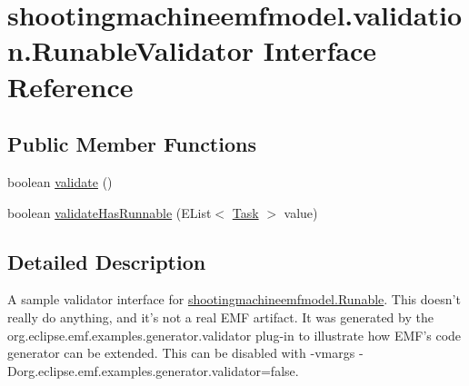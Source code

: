 \hypertarget{interfaceshootingmachineemfmodel_1_1validation_1_1_runable_validator}{\section{shootingmachineemfmodel.\-validation.\-Runable\-Validator Interface Reference}
\label{interfaceshootingmachineemfmodel_1_1validation_1_1_runable_validator}
}
\subsection*{Public Member Functions}
\begin{DoxyCompactItemize}
\item 
boolean \hyperlink{interfaceshootingmachineemfmodel_1_1validation_1_1_runable_validator_ac7ad034eb588dce3592d0c477161ca64}{validate} ()
\item 
boolean \hyperlink{interfaceshootingmachineemfmodel_1_1validation_1_1_runable_validator_ae59fc25d3e633b226c1d023cae7a4ae3}{validate\-Has\-Runnable} (E\-List$<$ \hyperlink{interfaceshootingmachineemfmodel_1_1_task}{Task} $>$ value)
\end{DoxyCompactItemize}


\subsection{Detailed Description}
A sample validator interface for \hyperlink{}{shootingmachineemfmodel.\-Runable}. This doesn't really do anything, and it's not a real E\-M\-F artifact. It was generated by the org.\-eclipse.\-emf.\-examples.\-generator.\-validator plug-\/in to illustrate how E\-M\-F's code generator can be extended. This can be disabled with -\/vmargs -\/\-Dorg.\-eclipse.\-emf.\-examples.\-generator.\-validator=false. 


